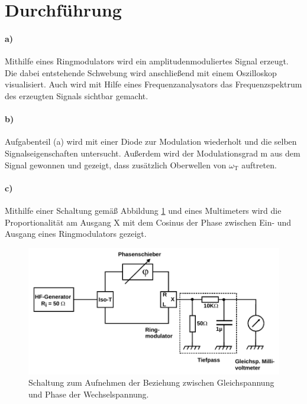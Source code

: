 \section{Durchf\"{u}hrung}

\paragraph{a)}
\label{par:a}
Mithilfe eines Ringmodulators wird ein amplitudenmoduliertes Signal erzeugt. Die dabei entstehende Schwebung wird anschließend mit einem
Oszilloskop visualisiert. Auch wird mit Hilfe eines Frequenzanalysators das Frequenzspektrum des erzeugten Signals sichtbar gemacht.

\paragraph{b)}
\label{par:b}
Aufgabenteil (a) wird mit einer Diode zur Modulation wiederholt und die selben Signalseigenschaften untersucht.
Außerdem wird der Modulationsgrad m aus dem Signal gewonnen und gezeigt, dass zusätzlich Oberwellen von $\omega_\text{T}$ auftreten.

\paragraph{c)}
\label{par:c}
Mithilfe einer Schaltung gemäß Abbildung \ref{Abb14} und eines Multimeters wird die Proportionalität am Ausgang X mit dem Cosinus der Phase zwischen 
Ein- und Ausgang eines Ringmodulators gezeigt.

\begin{figure}
	\centering
	\includegraphics[width=\textwidth]{img/Abb14.pdf}
	\caption{Schaltung zum Aufnehmen der Beziehung zwischen Gleichspannung und Phase der Wechselspannung. \cite{FP}}
	\label{Abb14}
\end{figure}

